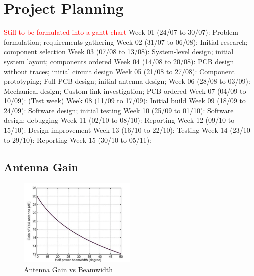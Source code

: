 \graphicspath{{./figures}}

\chapter{Project Planning}
\textcolor{red}{Still to be formulated into a gantt chart}
Week 01 (24/07 to 30/07): Problem formulation; requirements gathering
Week 02 (31/07 to 06/08): Initial research; component selection
Week 03 (07/08 to 13/08): System-level design; initial system layout; components ordered
Week 04 (14/08 to 20/08): PCB design without traces; initial circuit design
Week 05 (21/08 to 27/08): Component prototyping; Full PCB design; initial antenna design;
Week 06 (28/08 to 03/09): Mechanical design; Custom link investigation; PCB ordered
Week 07 (04/09 to 10/09): (Test week)
Week 08 (11/09 to 17/09): Initial build
Week 09 (18/09 to 24/09): Software design; initial testing
Week 10 (25/09 to 01/10): Software design; debugging
Week 11 (02/10 to 08/10): Reporting
Week 12 (09/10 to 15/10): Design improvement
Week 13 (16/10 to 22/10): Testing
Week 14 (23/10 to 29/10): Reporting
Week 15 (30/10 to 05/11):




\section{Antenna Gain}
\begin{figure}[!htb]
  \centering
  \includegraphics[width=0.5\textwidth]{antennaGain}
  \caption{Antenna Gain vs Beamwidth \cite{paper-yagiGainBeamwidth}}
  \label{fig:antennaGain}
\end{figure}


